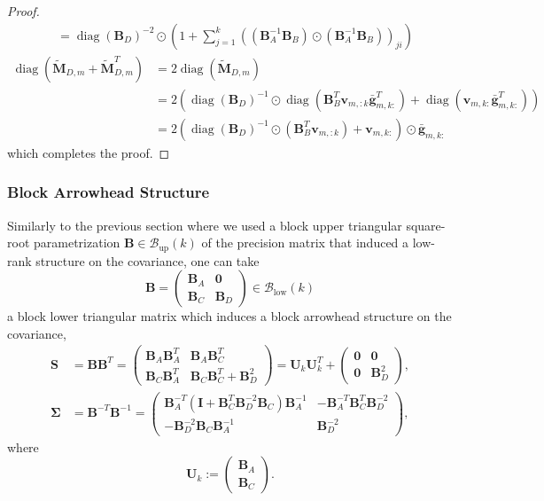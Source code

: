 \documentclass[a4paper, 11pt, oneside]{scrartcl}
\theoremstyle{break}
\DeclareMathOperator{\diag}{diag}
\newcommand{\matr}[1]{\boldsymbol{#1}}
\newcommand{\set}[1]{\mathcal{#1}}
\numberwithin{equation}{section}
\begin{document}
\begin{proof}
\begin{align*}
						&= \diag(\matr{B}_D)^{-2} \odot \left(1 + \sum_{j=1}^k ((\matr{B}_A^{-1} \matr{B}_B) \odot (\matr{B}_A^{-1} \matr{B}_B))_{ji} \right)
					\end{align*}
					\begin{align*}
						\diag(\matr{\tilde{M}}_{D, m} + \matr{\tilde{M}}_{D, m}^T) &= 2 \diag(\matr{\tilde{M}}_{D, m}) \\
						&= 2 (\diag(\matr{B}_D)^{-1} \odot \diag(\matr{B}_B^T \matr{v}_{m, :k} \matr{\bar{g}}_{m, k:}^T) + \diag(\matr{v}_{m, k:} \matr{\bar{g}}_{m, k:}^T)) \\
						&= 2 (\diag(\matr{B}_D)^{-1} \odot (\matr{B}_B^T \matr{v}_{m, :k}) + \matr{v}_{m, k:}) \odot \matr{\bar{g}}_{m, k:}
					\end{align*}
					which completes the proof.
				\end{proof}

			\subsubsection{Block Arrowhead Structure}
				Similarly to the previous section where we used a block upper triangular square-root parametrization $\matr{B} \in \set{B}_{\text{up}}(k)$ of the precision matrix that induced a low-rank structure on the covariance, one can take 
				\begin{equation*}
					\matr{B} = \begin{pmatrix} \matr{B}_A & \matr{0} \\ \matr{B}_C & \matr{B}_D \end{pmatrix} \in \set{B}_{\text{low}}(k)
				\end{equation*}
				a block lower triangular matrix which induces a block arrowhead structure on the covariance,
				\begin{align*}
					\matr{S} &= \matr{B} \matr{B}^T = \begin{pmatrix} \matr{B}_A \matr{B}_A^T & \matr{B}_A \matr{B}_C^T \\ \matr{B}_C \matr{B}_A^T & \matr{B}_C \matr{B}_C^T + \matr{B}_D^2 \end{pmatrix} = \matr{U}_k \matr{U}_k^T + \begin{pmatrix} \matr{0} & \matr{0} \\ \matr{0} & \matr{B}_D^2 \end{pmatrix}, \\
					\matr{\Sigma} &= \matr{B}^{-T} \matr{B}^{-1} = \begin{pmatrix} \matr{B}_A^{-T} (\matr{I} + \matr{B}_C^T \matr{B}_D^{-2} \matr{B}_C) \matr{B}_A^{-1} & -\matr{B}_A^{-T} \matr{B}_C^T \matr{B}_D^{-2} \\ -\matr{B}_D^{-2} \matr{B}_C \matr{B}_A^{-1} & \matr{B}_D^{-2} \end{pmatrix},
				\end{align*}
				where
				\begin{equation*}
					\matr{U}_k := \begin{pmatrix} \matr{B}_A \\ \matr{B}_C \end{pmatrix}.
				\end{equation*}
\end{document}

